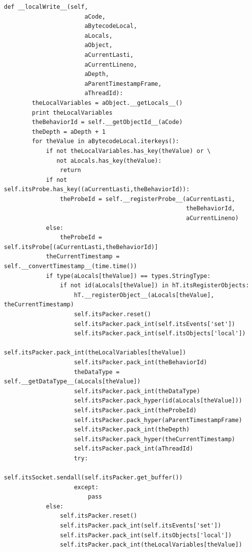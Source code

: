 \documentclass[12pt,legalpaper]{report}
\begin{document}
\begin{singlespace}
\begin{lstlisting}[style=Python]
    def __localWrite__(self,
                       aCode,
                       aBytecodeLocal,
                       aLocals,
                       aObject,
                       aCurrentLasti,
                       aCurrentLineno,
                       aDepth,
                       aParentTimestampFrame, 
                       aThreadId):
        theLocalVariables = aObject.__getLocals__()
        print theLocalVariables
        theBehaviorId = self.__getObjectId__(aCode)
        theDepth = aDepth + 1
        for theValue in aBytecodeLocal.iterkeys():
            if not theLocalVariables.has_key(theValue) or \
               not aLocals.has_key(theValue):
                return
            if not self.itsProbe.has_key((aCurrentLasti,theBehaviorId)):
                theProbeId = self.__registerProbe__(aCurrentLasti,
                                                    theBehaviorId,
                                                    aCurrentLineno)
            else:
                theProbeId = self.itsProbe[(aCurrentLasti,theBehaviorId)]
            theCurrentTimestamp = self.__convertTimestamp__(time.time())
            if type(aLocals[theValue]) == types.StringType:
                if not id(aLocals[theValue]) in hT.itsRegisterObjects:
                    hT.__registerObject__(aLocals[theValue], theCurrentTimestamp)
                    self.itsPacker.reset()
                    self.itsPacker.pack_int(self.itsEvents['set'])
                    self.itsPacker.pack_int(self.itsObjects['local'])
                    self.itsPacker.pack_int(theLocalVariables[theValue])
                    self.itsPacker.pack_int(theBehaviorId)
                    theDataType = self.__getDataType__(aLocals[theValue])
                    self.itsPacker.pack_int(theDataType)
                    self.itsPacker.pack_hyper(id(aLocals[theValue]))
                    self.itsPacker.pack_int(theProbeId)
                    self.itsPacker.pack_hyper(aParentTimestampFrame)
                    self.itsPacker.pack_int(theDepth) 
                    self.itsPacker.pack_hyper(theCurrentTimestamp)
                    self.itsPacker.pack_int(aThreadId)
                    try:
                        self.itsSocket.sendall(self.itsPacker.get_buffer())
                    except:
                        pass                   
            else:    
                self.itsPacker.reset()
                self.itsPacker.pack_int(self.itsEvents['set'])
                self.itsPacker.pack_int(self.itsObjects['local'])
                self.itsPacker.pack_int(theLocalVariables[theValue])

\end{lstlisting}
\end{singlespace}
\end{document}

